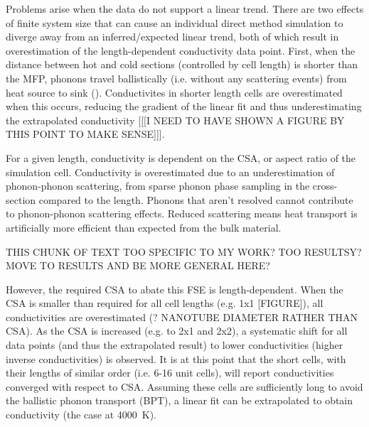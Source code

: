 \documentclass[%
preprint,                                  %
nofootinbib,
 amsmath,amssymb,
 aps,
]{revtex4-1}
\begin{document}

Problems arise when the data do not support a linear trend. There are two effects of finite system size that can cause an individual direct method simulation to diverge away from an inferred/expected linear trend, both of which result in overestimation of the length-dependent conductivity data point. First, when the distance between hot and cold sections (controlled by cell length) is shorter than the MFP, phonons travel ballistically (i.e. without any scattering events) from heat source to sink (\citet{Sellan2010}). Conductivites in shorter length cells are overestimated when this occurs, reducing the gradient of the linear fit and thus underestimating the extrapolated conductivity [[[I NEED TO HAVE SHOWN A FIGURE BY THIS POINT TO MAKE SENSE]]].

For a given length, conductivity is dependent on the CSA, or aspect ratio of the simulation cell. Conductivity is overestimated due to an underestimation of phonon-phonon scattering, from sparse phonon phase sampling in the cross-section compared to the length. Phonons that aren't resolved cannot contribute to phonon-phonon scattering effects. Reduced scattering means heat transport is artificially more efficient than expected from the bulk material. 

THIS CHUNK OF TEXT TOO SPECIFIC TO MY WORK? TOO RESULTSY? MOVE TO RESULTS AND BE MORE GENERAL HERE?

However, the required CSA to abate this FSE is length-dependent. When the CSA is smaller than required for all cell lengths (e.g. 1x1 [FIGURE]), all conductivities are overestimated (\citet{Thomas2010}? NANOTUBE DIAMETER RATHER THAN CSA). As the CSA is increased (e.g. to 2x1 and 2x2), a systematic shift for all data points (and thus the extrapolated result) to lower conductivities (higher inverse conductivities) is observed. It is at this point that the short cells, with their lengths of similar order (i.e. 6-16 unit cells), will report conductivities converged with respect to CSA. Assuming these cells are sufficiently long to avoid the ballistic phonon transport (BPT), a linear fit can be extrapolated to obtain conductivity (the case at 4000~K). 
\end{document}
